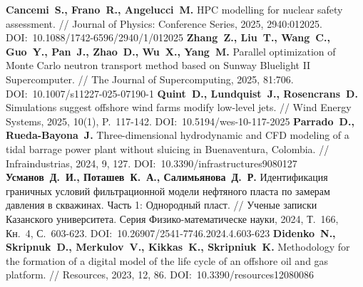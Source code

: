 \begin{thebibliography}{99}
%
\textbf{Cancemi~S., Frano~R., Angelucci~M.} HPC modelling for nuclear safety assessment. // Journal of Physics: Conference Series, 2025, 2940:012025. DOI:~10.1088/1742-6596/2940/1/012025
%
\textbf{Zhang~Z., Liu~T., Wang~C., Guo~Y., Pan~J., Zhao~D., Wu~X., Yang~M.} Parallel optimization of Monte Carlo neutron transport method based on Sunway Bluelight II Supercomputer. // The Journal of Supercomputing, 2025, 81:706. DOI:~10.1007/s11227-025-07190-1
%
\textbf{Quint~D., Lundquist~J., Rosencrans~D.} Simulations suggest offshore wind farms modify low-level jets. // Wind Energy Systems, 2025, 10(1), P.~117-142. DOI:~10.5194/wes-10-117-2025
%
\textbf{Parrado~D., Rueda-Bayona~J.} Three-dimensional hydrodynamic and CFD modeling of a tidal barrage power plant without sluicing in Buenaventura, Colombia. // Infraindustrias, 2024, 9, 127. DOI:~10.3390/infrastructures9080127
%
\textbf{Усманов~Д.~И., Поташев~К.~А., Салимьянова~Д.~Р.} Идентификация граничных условий фильтрационной модели нефтяного пласта по замерам давления в скважинах. Часть 1: Однородный пласт. // Ученые записки Казанского университета. Серия Физико-математическе науки, 2024, Т.~166, Кн.~4, С.~603-623. DOI:~10.26907/2541-7746.2024.4.603-623
%
\textbf{Didenko~N., Skripnuk~D., Merkulov~V., Kikkas~K., Skripniuk~K.} Methodology for the formation of a digital model of the life cycle of an offshore oil and gas platform. // Resources, 2023, 12, 86. DOI:~10.3390/resources12080086
%




\end{thebibliography}

